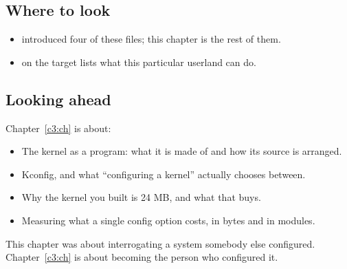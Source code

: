\subsection*{Where to look}
\begin{itemize}
  \item {} introduced four of these files; this chapter is the rest of them.
  \item {} on the target lists what this particular userland can do.
\end{itemize}

\subsection*{Looking ahead}
Chapter~\ref{c3:ch} is about:
\begin{itemize}
  \item The kernel as a program: what it is made of and how its source is arranged.
  \item Kconfig, and what ``configuring a kernel'' actually chooses between.
  \item Why the kernel you built is 24 MB, and what that buys.
  \item Measuring what a single config option costs, in bytes and in modules.
\end{itemize}
This chapter was about interrogating a system somebody else configured. Chapter~\ref{c3:ch} is
about becoming the person who configured it.

